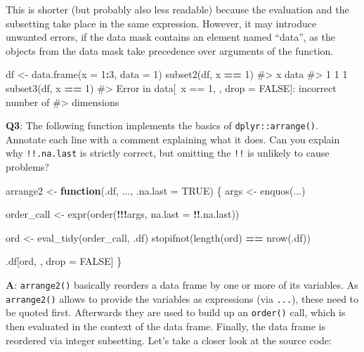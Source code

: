 \documentclass[
]{krantz}
\makeatletter
\newenvironment{Shaded}{\begin{snugshade}}{\end{snugshade}}
\newcommand{\CommentTok}[1]{\textcolor[rgb]{0.56,0.35,0.01}{\textit{#1}}}
\newcommand{\ControlFlowTok}[1]{\textcolor[rgb]{0.13,0.29,0.53}{\textbf{#1}}}
\newcommand{\DataTypeTok}[1]{\textcolor[rgb]{0.13,0.29,0.53}{#1}}
\newcommand{\DecValTok}[1]{\textcolor[rgb]{0.00,0.00,0.81}{#1}}
\newcommand{\KeywordTok}[1]{\textcolor[rgb]{0.13,0.29,0.53}{\textbf{#1}}}
\newcommand{\NormalTok}[1]{#1}
\newcommand{\OperatorTok}[1]{\textcolor[rgb]{0.81,0.36,0.00}{\textbf{#1}}}
\newcommand{\OtherTok}[1]{\textcolor[rgb]{0.56,0.35,0.01}{#1}}
\newcommand{\StringTok}[1]{\textcolor[rgb]{0.31,0.60,0.02}{#1}}
\newenvironment{kframe}{%
\medskip{}
\setlength{\fboxsep}{.8em}
 \def\at@end@of@kframe{}%
 \ifinner\ifhmode%
  \def\at@end@of@kframe{\end{minipage}}%
  \begin{minipage}{\columnwidth}%
 \fi\fi%
 \def\FrameCommand##1{\hskip\@totalleftmargin \hskip-\fboxsep
 \colorbox{shadecolor}{##1}\hskip-\fboxsep
     \hskip-\linewidth \hskip-\@totalleftmargin \hskip\columnwidth}%
 \MakeFramed {\advance\hsize-\width
   \@totalleftmargin\z@ \linewidth\hsize
   \@setminipage}}%
 {\par\unskip\endMakeFramed%
 \at@end@of@kframe}
\renewenvironment{Shaded}{\begin{kframe}}{\end{kframe}}
\renewcommand{\KeywordTok} [1]{\textcolor[rgb]{0.00,0.44,0.13}{{#1}}}
\renewcommand{\DataTypeTok}[1]{\textcolor[rgb]{0.56,0.13,0.00}{{#1}}}
\renewcommand{\DecValTok}  [1]{\textcolor[rgb]{0.25,0.63,0.44}{{#1}}}
\renewcommand{\StringTok}  [1]{\textcolor[rgb]{0.25,0.44,0.63}{{#1}}}
\renewcommand{\CommentTok} [1]{\textcolor[rgb]{0.38,0.63,0.69}{{#1}}}
\renewcommand{\OtherTok}   [1]{\textcolor[rgb]{0.00,0.44,0.13}{{#1}}}
\renewcommand{\NormalTok}  [1]{{#1}}
\makeatother
\begin{document}
This is shorter (but probably also less readable) because the evaluation and the subsetting take place in the same expression. However, it may introduce unwanted errors, if the data mask contains an element named ``data'', as the objects from the data mask take precedence over arguments of the function.

\begin{Shaded}
\begin{Highlighting}[]
\NormalTok{df <-}\StringTok{ }\KeywordTok{data.frame}\NormalTok{(}\DataTypeTok{x =} \DecValTok{1}\OperatorTok{:}\DecValTok{3}\NormalTok{, }\DataTypeTok{data =} \DecValTok{1}\NormalTok{)}
\KeywordTok{subset2}\NormalTok{(df, x }\OperatorTok{==}\StringTok{ }\DecValTok{1}\NormalTok{)}
\CommentTok{#>   x data}
\CommentTok{#> 1 1    1}
\KeywordTok{subset3}\NormalTok{(df, x }\OperatorTok{==}\StringTok{ }\DecValTok{1}\NormalTok{)}
\CommentTok{#> Error in data[~x == 1, , drop = FALSE]: incorrect number of}
\CommentTok{#> dimensions}
\end{Highlighting}
\end{Shaded}

\textbf{{Q3}}: The following function implements the basics of \texttt{dplyr::arrange()}. Annotate each line with a comment explaining what it does. Can you explain why \texttt{!!.na.last} is strictly correct, but omitting the \texttt{!!} is unlikely to cause problems?

\begin{Shaded}
\begin{Highlighting}[]
\NormalTok{arrange2 <-}\StringTok{ }\ControlFlowTok{function}\NormalTok{(.df, ..., }\DataTypeTok{.na.last =} \OtherTok{TRUE}\NormalTok{) \{}
\NormalTok{  args <-}\StringTok{ }\KeywordTok{enquos}\NormalTok{(...)}
  
\NormalTok{  order_call <-}\StringTok{ }\KeywordTok{expr}\NormalTok{(}\KeywordTok{order}\NormalTok{(}\OperatorTok{!!!}\NormalTok{args, }\DataTypeTok{na.last =} \OperatorTok{!!}\NormalTok{.na.last))}
  
\NormalTok{  ord <-}\StringTok{ }\KeywordTok{eval_tidy}\NormalTok{(order_call, .df)}
  \KeywordTok{stopifnot}\NormalTok{(}\KeywordTok{length}\NormalTok{(ord) }\OperatorTok{==}\StringTok{ }\KeywordTok{nrow}\NormalTok{(.df))}
  
\NormalTok{  .df[ord, , drop =}\StringTok{ }\OtherTok{FALSE}\NormalTok{]}
\NormalTok{\}}
\end{Highlighting}
\end{Shaded}

\textbf{{A}}: \texttt{arrange2()} basically reorders a data frame by one or more of its variables. As \texttt{arrange2()} allows to provide the variables as expressions (via \texttt{...}), these need to be quoted first. Afterwards they are used to build up an \texttt{order()} call, which is then evaluated in the context of the data frame. Finally, the data frame is reordered via integer subsetting. Let's take a closer look at the source code:
\end{document}
